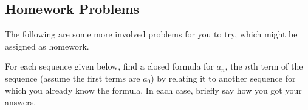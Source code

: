 

\subsection*{Homework Problems}

The following are some more involved problems for you to try, which might be assigned as homework.

\begin{questions}

\question For each sequence given below, find a closed formula for $a_n$, the $n$th term of the sequence (assume the first terms are $a_0$) by relating it to another sequence for which you already know the formula.  In each case, briefly say how you got your answers.  
\end{questions}
